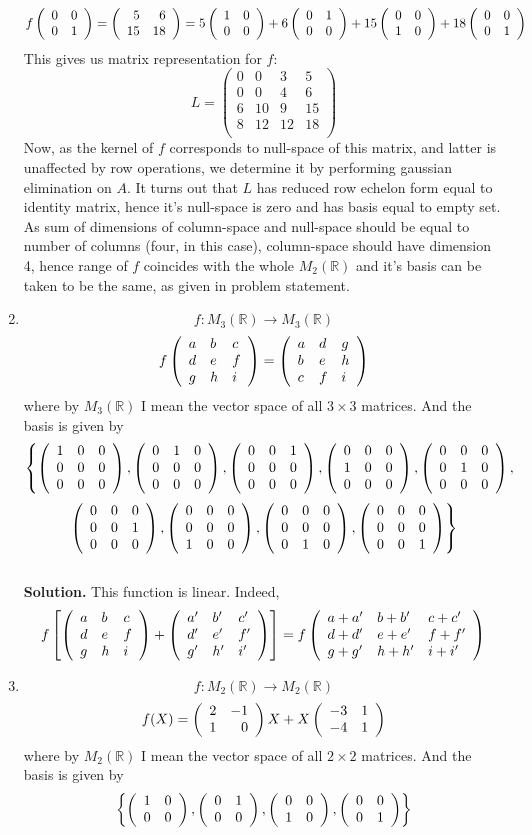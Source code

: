 \documentclass[12pt]{article} %
\begin{document}
\begin{enumerate}
	\[f\left(\begin{array}{rr}0&0\\0&1\end{array}\right)=
\left(\begin{array}{rr}
5&6\\
15&18\\
\end{array}\right)=5\left(\begin{array}{rr}1&0\\0&0\end{array}\right)+6\left(\begin{array}{rr}0&1\\0&0\end{array}\right)+15\left(\begin{array}{rr}0&0\\1&0\end{array}\right)+18\left(\begin{array}{rr}0&0\\0&1\end{array}\right)\]
This gives us matrix representation for $f$:
\[L=\left(\begin{array}{rrrr}
	0&0&3&5\\
	0&0&4&6\\
	6&10&9&15\\
	8&12&12&18\\
\end{array}\right)\]
Now, as the kernel of $f$ corresponds to null-space of this matrix, and latter is unaffected by row operations, we determine it
by performing gaussian elimination on $A$. It turns out that $L$ has reduced row echelon form equal to identity matrix, hence
it's null-space is zero and has basis equal to empty set. As sum of dimensions of column-space and null-space should be equal
to number of columns (four, in this case), column-space should have dimension 4, hence range of $f$ coincides with the whole $M_2(
\mathbb{R})$ and it's basis can be taken to be the same, as given in problem statement.
\item \[f:M_3(\mathbb{R})\to M_3(\mathbb{R})\]%
	\[f\left(\begin{array}{lll}a&b&c\\d&e&f\\g&h&i\end{array}\right)=\left(\begin{array}{lll}a&d&g\\b&e&h\\c&f&i\end{array}\right)\]
	where by $M_3(\mathbb{R})$ I mean the vector space of all $3\times3$ matrices. And the basis is given by
	\[\left\{
	\left(\begin{array}{lll}1&0&0\\0&0&0\\0&0&0\end{array}\right),
	\left(\begin{array}{lll}0&1&0\\0&0&0\\0&0&0\end{array}\right),
	\left(\begin{array}{lll}0&0&1\\0&0&0\\0&0&0\end{array}\right),
	\left(\begin{array}{lll}0&0&0\\1&0&0\\0&0&0\end{array}\right),
	\left(\begin{array}{lll}0&0&0\\0&1&0\\0&0&0\end{array}\right),\right.\]\[\left.
	\left(\begin{array}{lll}0&0&0\\0&0&1\\0&0&0\end{array}\right),
	\left(\begin{array}{lll}0&0&0\\0&0&0\\1&0&0\end{array}\right),
	\left(\begin{array}{lll}0&0&0\\0&0&0\\0&1&0\end{array}\right),
	\left(\begin{array}{lll}0&0&0\\0&0&0\\0&0&1\end{array}\right)
	\right\}\]
	\\\textbf{Solution.} 
	This function is linear. Indeed, 
	\[f\left[\left(\begin{array}{lll}a&b&c\\d&e&f\\g&h&i\end{array}\right)+
	\left(\begin{array}{lll}a'&b'&c'\\d'&e'&f'\\g'&h'&i'\end{array}\right)\right]=f\left(\begin{array}{lll}a+a'&b+b'&c+c'\\d+d'&e+e'&f+f'\\g+g'&h+h'&i+i'\end{array}\right)\]
\item \[f:M_2(\mathbb{R})\to M_2(\mathbb{R})\]%
	\[f(X)=\left(\begin{array}{rr}2&-1\\1&0\end{array}\right)X+X\left(\begin{array}{rr}-3&1\\-4&1\end{array}\right)\]
	where by $M_2(\mathbb{R})$ I mean the vector space of all $2\times2$ matrices. And the basis is given by
	\[\left\{\left(\begin{array}{rr}1&0\\0&0\end{array}\right),\left(\begin{array}{rr}0&1\\0&0\end{array}\right),\left(\begin{array}{rr}0&0\\1&0\end{array}\right),\left(\begin{array}{rr}0&0\\0&1\end{array}\right)\right\}\]
\end{enumerate}
\end{document}
